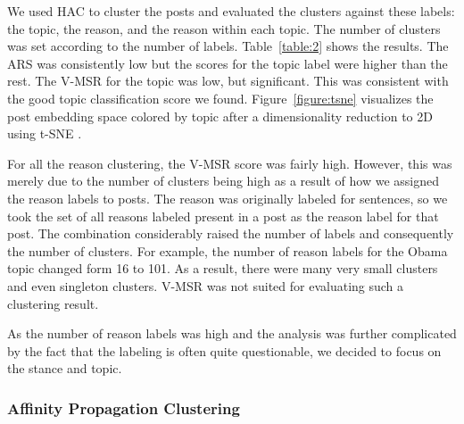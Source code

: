 \documentclass[11pt]{article}
\begin{document}
We used HAC to cluster the posts and evaluated the clusters against these labels:
the topic, the reason, and the reason within each topic.
The number of clusters was set according to the number of labels.
Table~\ref{table:2} shows the results.
The ARS was consistently low but the scores for the topic label were higher than the rest.
The V-MSR for the topic was low, but significant.
This was consistent with the good topic classification score we found.
Figure~\ref{figure:tsne} visualizes the post embedding space colored by topic
after a dimensionality reduction to 2D using t-SNE \parencite{maaten2008visualizing}.

For all the reason clustering, the V-MSR score was fairly high.
However, this was merely due to the number of clusters being high
as a result of how we assigned the reason labels to posts.
The reason was originally labeled for sentences,
so we took the set of all reasons labeled present in a post as the reason label for that post.
The combination considerably raised the number of labels and consequently the number of clusters.
For example, the number of reason labels for the Obama topic changed form 16 to 101.
As a result, there were many very small clusters and even singleton clusters.
V-MSR was not suited for evaluating such a clustering result.

As the number of reason labels was high and the analysis was further complicated by the fact that the labeling is often quite questionable,
we decided to focus on the stance and topic.

\subsubsection*{Affinity Propagation Clustering}
\end{document}
